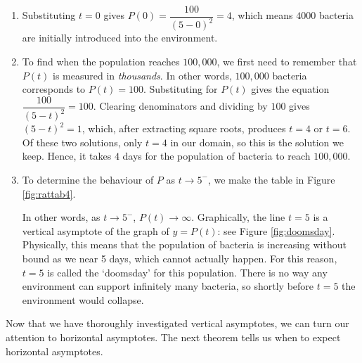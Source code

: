 {
\begin{enumerate}

\item  Substituting $t=0$ gives $P(0) = \dfrac{100}{(5-0)^2} = 4$, which means $4000$ bacteria are initially introduced into the environment.

\item  To find when the population reaches $100,\! 000$, we first need to remember that $P(t)$ is measured in \textit{thousands}.  In other words, $100,\! 000$ bacteria corresponds to $P(t) = 100$.  Substituting for $P(t)$ gives the equation  $\dfrac{100}{(5-t)^2} = 100$.  Clearing denominators and dividing by $100$ gives $(5-t)^2=1$, which, after extracting square roots, produces $t = 4$ or $t=6$.  Of these two solutions, only $t=4$ in our domain, so this is the solution we keep.  Hence, it takes $4$ days for the population of bacteria to reach $100,\! 000$.

\item To determine the behaviour of $P$ as $t \rightarrow 5^{-}$, we make the table in Figure \ref{fig:rattab4}.



In other words, as $t \rightarrow 5^{-}$, $P(t) \rightarrow \infty$.  Graphically, the line $t=5$ is a vertical asymptote of the graph of $y=P(t)$: see Figure \ref{fig:doomsday}.  Physically, this means that the population of bacteria is increasing without bound as we near 5 days, which cannot actually happen.  For this reason, $t=5$ is called the `doomsday' for this population. There is no way any environment can support infinitely many bacteria, so shortly before $t = 5$ the environment would collapse.
\end{enumerate}
}

\medskip

Now that we have thoroughly investigated vertical asymptotes, we can turn our attention to horizontal asymptotes.  The next theorem tells us when to expect horizontal asymptotes.

